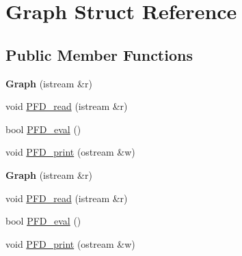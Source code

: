 \hypertarget{struct_graph}{\section{Graph Struct Reference}
\label{struct_graph}
}
\subsection*{Public Member Functions}
\begin{DoxyCompactItemize}
\item 
\hypertarget{struct_graph_a027cae955d12fe3635094c8a6e91880d}{{\bfseries Graph} (istream \&r)}\label{struct_graph_a027cae955d12fe3635094c8a6e91880d}

\item 
void \hyperlink{struct_graph_a07988362cfd085560a746c1e1e4604df}{P\+F\+D\+\_\+read} (istream \&r)
\item 
bool \hyperlink{struct_graph_ac6a0946ed59ad938626736c9c5e084e6}{P\+F\+D\+\_\+eval} ()
\item 
void \hyperlink{struct_graph_a827cc502fc4ff3dcd45f54daf6b66aa1}{P\+F\+D\+\_\+print} (ostream \&w)
\item 
\hypertarget{struct_graph_a027cae955d12fe3635094c8a6e91880d}{{\bfseries Graph} (istream \&r)}\label{struct_graph_a027cae955d12fe3635094c8a6e91880d}

\item 
void \hyperlink{struct_graph_a07988362cfd085560a746c1e1e4604df}{P\+F\+D\+\_\+read} (istream \&r)
\item 
bool \hyperlink{struct_graph_ac6a0946ed59ad938626736c9c5e084e6}{P\+F\+D\+\_\+eval} ()
\item 
void \hyperlink{struct_graph_a827cc502fc4ff3dcd45f54daf6b66aa1}{P\+F\+D\+\_\+print} (ostream \&w)
\end{DoxyCompactItemize}
